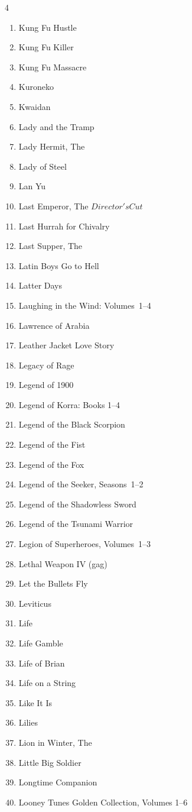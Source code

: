 \documentclass{article}
\begin{document}
\begin{multicols}{4}
\begin{enumerate}
\item Kung Fu Hustle
\item Kung Fu Killer
\item Kung Fu Massacre
\item Kuroneko
\item Kwaidan
\item Lady and the Tramp
\item Lady Hermit, The
\item Lady of Steel
\item Lan Yu
\item Last Emperor, The \(Director's Cut\)
\item Last Hurrah for Chivalry
\item Last Supper, The
\item Latin Boys Go to Hell
\item Latter Days
\item Laughing in the Wind: Volumes~1--4
\item Lawrence of Arabia
\item Leather Jacket Love Story
\item Legacy of Rage
\item Legend of 1900
\item Legend of Korra: Books 1--4
\item Legend of the Black Scorpion
\item Legend of the Fist
\item Legend of the Fox
\item Legend of the Seeker, Seasons~1--2
\item Legend of the Shadowless Sword
\item Legend of the Tsunami Warrior
\item Legion of Superheroes, Volumes~1--3
\item Lethal Weapon IV (gag)
\item Let the Bullets Fly
\item Leviticus
\item Life
\item Life Gamble
\item Life of Brian
\item Life on a String
\item Like It Is
\item Lilies
\item Lion in Winter, The
\item Little Big Soldier
\item Longtime Companion
\item Looney Tunes Golden Collection, Volumes 1--6

\end{enumerate}
\end{multicols}
\end{document}
